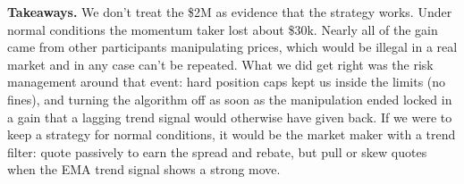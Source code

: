 \documentclass[11pt]{article}
\begin{document}
\textbf{Takeaways.} We don't treat the \$2M as evidence that the strategy works.
Under normal conditions the momentum taker lost about \$30k. Nearly all of the
gain came from other participants manipulating prices, which would be illegal in
a real market and in any case can't be repeated. What we did get right was the
risk management around that event: hard position caps kept us inside the limits
(no fines), and turning the algorithm off as soon as the manipulation ended
locked in a gain that a lagging trend signal would otherwise have given back. If
we were to keep a strategy for normal conditions, it would be the market maker
with a trend filter: quote passively to earn the spread and rebate, but pull or
skew quotes when the EMA trend signal shows a strong move.
\end{document}

